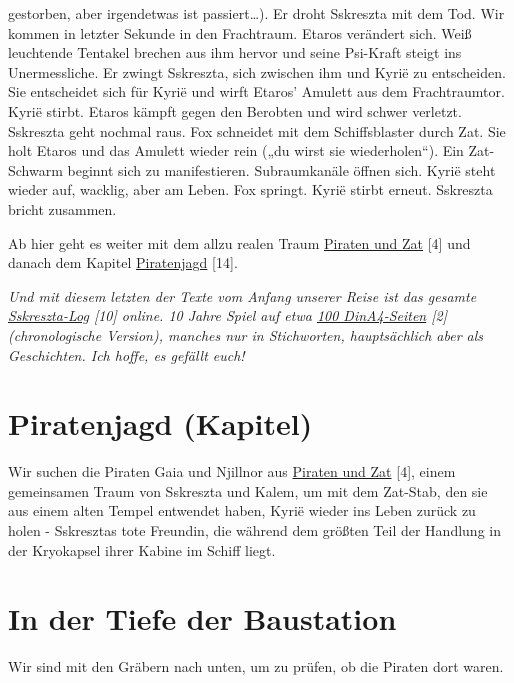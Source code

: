 \documentclass[11pt]{article}
\begin{document}
\begin{itemize}
{  gestorben, aber irgendetwas ist passiert\ldots{})}. Er droht Sskreszta
  mit dem Tod. Wir kommen in letzter Sekunde in den Frachtraum. Etaros
  verändert sich. Weiß leuchtende Tentakel brechen aus ihm hervor und
  seine Psi-Kraft steigt ins Unermessliche. Er zwingt Sskreszta, sich
  zwischen ihm und Kyrië zu entscheiden. Sie entscheidet sich für Kyrië
  und wirft Etaros' Amulett aus dem Frachtraumtor. Kyrië stirbt. Etaros
  kämpft gegen den Berobten und wird schwer verletzt. Sskreszta geht
  nochmal raus. Fox schneidet mit dem Schiffsblaster durch Zat. Sie holt
  Etaros und das Amulett wieder rein („du wirst sie wiederholen``). Ein
  Zat-Schwarm beginnt sich zu manifestieren. Subraumkanäle öffnen sich.
  Kyrië steht wieder auf, wacklig, aber am Leben. Fox springt. Kyrië
  stirbt erneut. Sskreszta bricht zusammen.
\end{itemize}
Ab hier geht es weiter mit dem allzu realen Traum
\href{http://1w6.org/deutsch/welten/raumzeit/geschichten/piraten-und-zerg}{Piraten
und Zat} {[}4{]} und danach dem Kapitel
\href{http://1w6.org/deutsch/waechter-der-zeit/aufzeichnungen/sskreszta/piratenjagd}{Piratenjagd}
{[}14{]}.

\emph{Und mit diesem letzten der Texte vom Anfang unserer Reise ist das
gesamte
\href{http://1w6.org/deutsch/kampagnen/friedenszwang/aufzeichnungen/sskreszta-log}{Sskreszta-Log}
{[}10{]} online. 10 Jahre Spiel auf etwa
\href{http://1w6.org/print/book/export/html/59}{100 DinA4-Seiten}
{[}2{]} (chronologische Version), manches nur in Stichworten,
hauptsächlich aber als Geschichten. Ich hoffe, es gefällt euch!}

\section{Piratenjagd (Kapitel)}

Wir suchen die Piraten Gaia und Njillnor aus
\href{http://1w6.org/deutsch/welten/raumzeit/geschichten/piraten-und-zerg}{Piraten
und Zat} {[}4{]}, einem gemeinsamen Traum von Sskreszta und Kalem, um
mit dem Zat-Stab, den sie aus einem alten Tempel entwendet haben, Kyrië
wieder ins Leben zurück zu holen - Sskresztas tote Freundin, die während
dem größten Teil der Handlung in der Kryokapsel ihrer Kabine im Schiff
liegt.

\section{In der Tiefe der Baustation}

Wir sind mit den Gräbern nach unten, um zu prüfen, ob die Piraten dort
waren.
\end{document}
